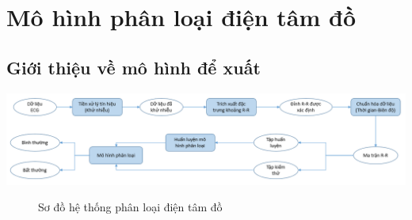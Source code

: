 \chapter{Mô hình phân loại điện tâm đồ }
\thispagestyle{fancy}

\section{Giới thiệu về mô hình để xuất}

\begin{center}
    \includegraphics[scale=.5]{image/chapter5/system.png}
    \begin{figure}[htp]
    \begin{center}
    \end{center}
    \caption{Sơ đồ hệ thống phân loại điện tâm đồ}
    \end{figure}
\end{center}

